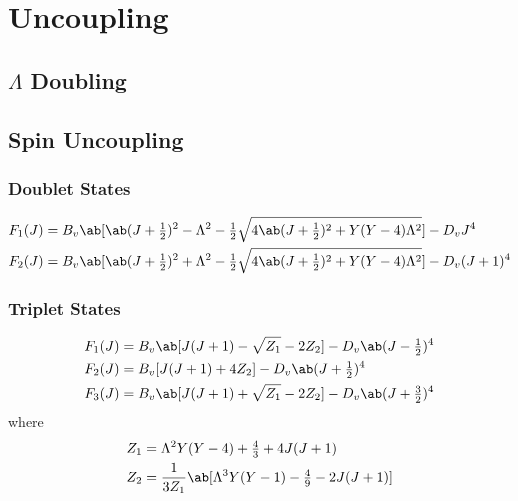 \chapter{Uncoupling}
\label{c:uncoupling}

\section{\texorpdfstring{$\Lambda$}{Λ} Doubling}
\label{s:lambda_doubling}

\section{Spin Uncoupling}
\label{s:spin_uncoupling}

\subsection{Doublet States}

\begin{align*}
    F_{1}(J) & = B_{v}\ab[\ab(J + \tfrac{1}{2})^{2} - \Lambda^{2} - \tfrac{1}{2}\sqrt{4\ab(J + \tfrac{1}{2})^{2} + Y(Y - 4)\Lambda^{2}}] - D_{v}J^{4}       \\
    F_{2}(J) & = B_{v}\ab[\ab(J + \tfrac{1}{2})^{2} + \Lambda^{2} - \tfrac{1}{2}\sqrt{4\ab(J + \tfrac{1}{2})^{2} + Y(Y - 4)\Lambda^{2}}] - D_{v}(J + 1)^{4}
\end{align*}

\subsection{Triplet States}

\begin{align*}
    F_{1}(J) & = B_{v}\ab[J(J + 1) - \sqrt{Z_{1}} - 2Z_{2}] - D_{v}\ab(J - \tfrac{1}{2})^{4} \\
    F_{2}(J) & = B_{v}[J(J + 1) + 4Z_{2}] - D_{v}\ab(J + \tfrac{1}{2})^{4}                   \\
    F_{3}(J) & = B_{v}\ab[J(J + 1) + \sqrt{Z_{1}} - 2Z_{2}] - D_{v}\ab(J + \tfrac{3}{2})^{4}
\end{align*}
where
\begin{align*}
    Z_{1} & = \Lambda^{2}Y(Y - 4) + \tfrac{4}{3} + 4J(J + 1)                      \\
    Z_{2} & = \frac{1}{3Z_{1}}\ab[\Lambda^{3}Y(Y - 1) - \tfrac{4}{9} - 2J(J + 1)]
\end{align*}
